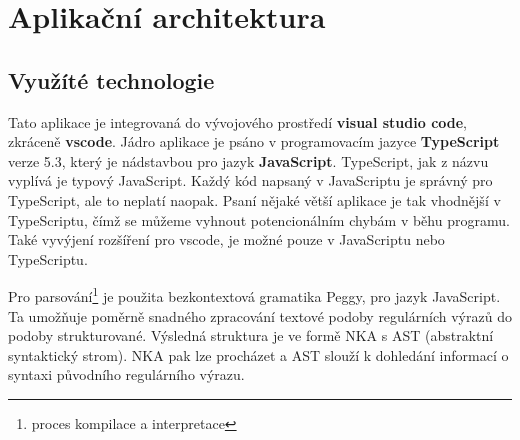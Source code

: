 \chapter{Aplikační architektura}\label{sec:Principle}

\section{Využíté technologie}
Tato aplikace je integrovaná do vývojového prostředí \textbf{visual studio code}, 
zkráceně \textbf{vscode}. Jádro aplikace je psáno v programovacím jazyce \textbf{TypeScript} verze 5.3, který je nádstavbou
pro jazyk \textbf{JavaScript}. TypeScript, jak z názvu vyplívá je typový JavaScript.
Každý kód napsaný v JavaScriptu je správný pro TypeScript, ale to neplatí naopak.
Psaní nějaké větší aplikace je tak vhodnější v TypeScriptu, 
čímž se můžeme vyhnout potencionálním chybám v běhu programu.
Také vyvýjení rozšíření pro vscode, je možné pouze v JavaScriptu nebo TypeScriptu.

Pro parsování\footnote{proces kompilace a interpretace} je použita bezkontextová gramatika Peggy, pro jazyk JavaScript.
Ta umožňuje poměrně snadného zpracování textové podoby regulárních výrazů do podoby strukturované.
Výsledná struktura je ve formě NKA s AST (abstraktní syntaktický strom). 
NKA pak lze procházet a AST slouží k dohledání informací o syntaxi původního regulárního výrazu.

